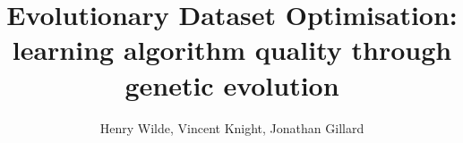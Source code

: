 \documentclass[10pt]{article}
\title{%
    Evolutionary Dataset Optimisation:
    learning algorithm quality through genetic evolution
}
\author{Henry Wilde, Vincent Knight, Jonathan Gillard}
\date{}
\begin{document}
\maketitle%
\bigskip%


\newpage%




\end{document}
